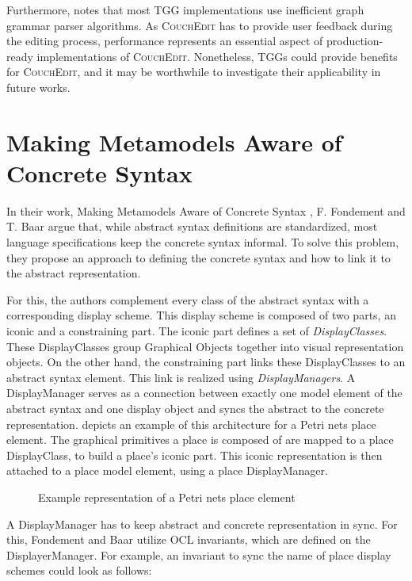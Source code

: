Furthermore, \cite{schurr_15_2008} notes that most TGG implementations use inefficient graph grammar parser algorithms. As \textsc{CouchEdit} has to provide user feedback during the editing process, performance represents an essential aspect of production-ready implementations of \textsc{CouchEdit}. Nonetheless, TGGs could provide benefits for \textsc{CouchEdit}, and it may be worthwhile to investigate their applicability in future works. 



\section{Making Metamodels Aware of Concrete Syntax}
\label{sec:fondement}
In their work, Making Metamodels Aware of Concrete Syntax \cite{fondement_making_2005}, F. Fondement and T. Baar argue that, while abstract syntax definitions are standardized, most language specifications keep the concrete syntax informal. To solve this problem, they propose an approach to defining the concrete syntax and how to link it to the abstract representation.

For this, the authors complement every class of the abstract syntax with a corresponding display scheme. This display scheme is composed of two parts, an iconic and a constraining part. The iconic part defines a set of \emph{DisplayClasses}. These DisplayClasses group Graphical Objects together into visual representation objects. On the other hand, the constraining part links these DisplayClasses to an abstract syntax element. This link is realized using \emph{DisplayManagers}. A DisplayManager serves as a connection between exactly one model element of the abstract syntax and one display object and syncs the abstract to the concrete representation.  depicts an example of this architecture for a Petri nets place element. The graphical primitives a place is composed of are mapped to a place DisplayClass, to build a place's iconic part. This iconic representation is then attached to a place model element, using a place DisplayManager.


\begin{figure}[H]
  \centering
  
  \caption{Example representation of a Petri nets place element}
  \label{fig:fondement_dm}
\end{figure}

A DisplayManager has to keep abstract and concrete representation in sync. For this, Fondement and Baar utilize OCL invariants, which are defined on the DisplayerManager. For example, an invariant to sync the name of place display schemes could look as follows:

